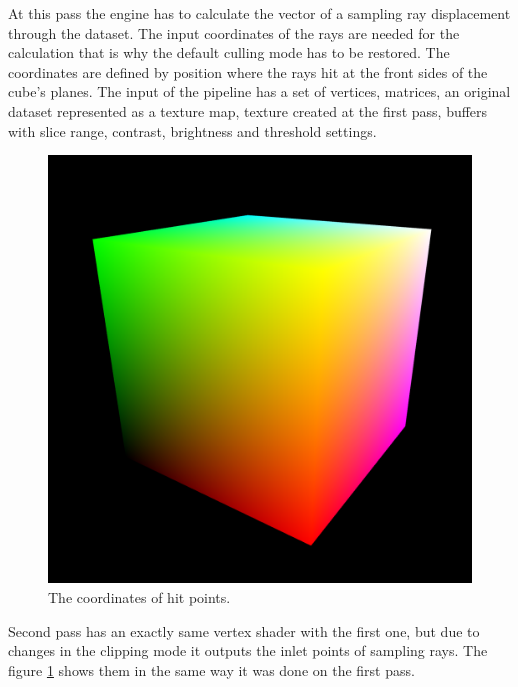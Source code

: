 \documentclass[twoside, english, 11pt]{report}
\begin{document}
At this pass the engine has to calculate the vector of a sampling ray displacement through the dataset. The input coordinates of the rays are needed for the calculation that is why the default culling mode has to be restored. The coordinates are defined by position where the rays hit at the front sides of the cube's planes. The input of the pipeline has a set of vertices, matrices, an original dataset represented as a texture map, texture created at the first pass, buffers with slice range, contrast, brightness and threshold settings.\\
\begin{figure}[!h]
\centerline{\includegraphics[scale = 0.3]{img/second}}
\caption{The coordinates of hit points.\label{fig:second}}
\end{figure}

Second pass has an exactly same vertex shader with the first one, but due to changes in the clipping mode it outputs the inlet points of sampling rays. The figure \ref{fig:second} shows them in the same way it was done on the first pass.\\
\end{document}

